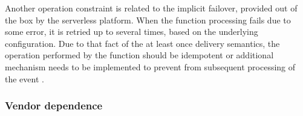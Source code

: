 Another operation constraint is related to the implicit failover, provided out of the box by the serverless platform. When the function processing fails due to some error, it is retried up to several times, based on the underlying configuration. Due to that fact of the at least once delivery semantics, the operation performed by the function should be idempotent or additional mechanism needs to be implemented to prevent from subsequent processing of the event \cite{EvaluationOfServerlessApplicationProgrammingModel}.







\subsubsection{Vendor dependence} \label{chapter:serverless-suitability-vendor-dependence}

